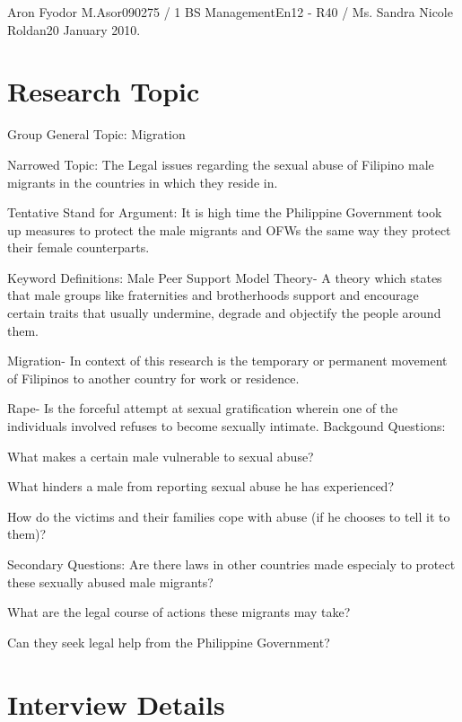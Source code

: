 \documentclass[letterpaper]{article}
\begin{document}
\begin{mla}{Aron Fyodor M.}{Asor}{090275 / 1 BS Management}{En12 - R40 / Ms. Sandra Nicole Roldan}{20 January 2010}{. }


\section{Research Topic}

	\noindent Group General Topic: Migration

	\noindent  Narrowed Topic: The Legal issues regarding the sexual abuse of Filipino male migrants in the countries in which they reside in.

	\noindent Tentative Stand for Argument: It is high time the Philippine Government took up measures to protect the male migrants and OFWs the same way they protect their female counterparts.


	\begin{outline}[itemize]
	 \1 Keyword Definitions:
	 \2 Male Peer Support Model Theory- A theory which states that male groups like fraternities and brotherhoods support and encourage certain traits that usually undermine, degrade and objectify the people around them.

	 \2 Migration- In context of this research is the temporary or permanent movement of Filipinos to another country for work or residence.
	
	 \2 Rape- Is the forceful attempt at sexual gratification wherein one of the individuals involved refuses to become sexually intimate.
	\1 Backgound Questions:

	\2 What makes a certain male vulnerable to sexual abuse?

	\2 What hinders a male from reporting sexual abuse he has experienced?

	\2 How do the victims and their families cope with abuse (if he chooses to tell it to them)?

	\1 Secondary Questions:	
	\2 Are there laws in other countries made especialy to protect these sexually abused male migrants?

	\2 What are the legal course of actions these migrants may take?

	\2 Can they seek legal help from the Philippine Government?
	

	\end{outline}
\section{Interview Details}

\end{mla}
\end{document}
